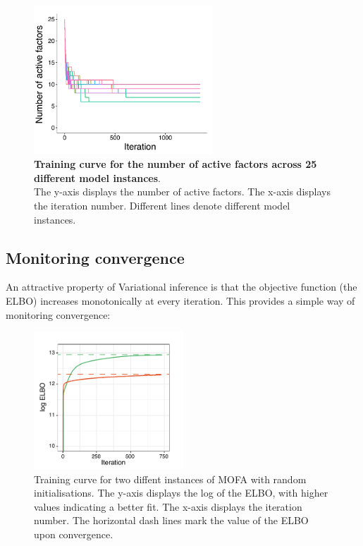 \begin{figure}[H]
	\centering 	
	\includegraphics[width=0.6\textwidth]{MOFA_nfactors}
	\caption{\textbf{Training curve for the number of active factors across 25 different model instances}.\\
	The y-axis displays the number of active factors. The x-axis displays the iteration number. Different lines denote different model instances.}
	\label{fig:mofa_nfactors}
\end{figure}


\subsection{Monitoring convergence}

An attractive property of Variational inference is that the objective function (the ELBO) increases monotonically at every iteration. This provides a simple way of monitoring convergence:

 \begin{figure}[H]
	\centering 	
	\includegraphics[width=0.5\textwidth]{elbo_convergence}
	\caption{Training curve for two diffent instances of MOFA with random initialisations. The y-axis displays the log of the ELBO, with higher values indicating a better fit. The x-axis displays the iteration number. The horizontal dash lines mark the value of the ELBO upon convergence. }
	\label{fig:elbo_convergence}
\end{figure}

